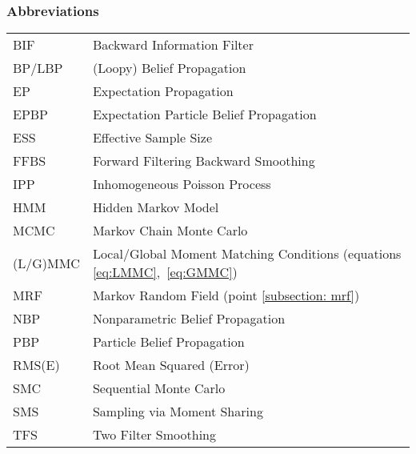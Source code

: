 %
\setlength{\tabcolsep}{6pt} %

\subsubsection*{Abbreviations}
\setlength{\tabcolsep}{12pt}
\renewcommand{\arraystretch}{1.2}
\begin{tabular}{ll}
BIF 	& Backward Information Filter\\
BP/LBP 	& (Loopy) Belief Propagation\\
EP	 	& Expectation Propagation\\
EPBP 	& Expectation Particle Belief Propagation\\
ESS 	& Effective Sample Size\\
FFBS 	& Forward Filtering Backward Smoothing \\
IPP 	& Inhomogeneous Poisson Process\\
HMM 	& Hidden Markov Model\\
MCMC 	& Markov Chain Monte Carlo\\
(L/G)MMC& Local/Global Moment Matching Conditions (equations \ref{eq:LMMC},~\ref{eq:GMMC})\\
MRF 	& Markov Random Field (point \ref{subsection: mrf})\\
NBP 	& Nonparametric Belief Propagation\\
PBP 	& Particle Belief Propagation\\
RMS(E) 	& Root Mean Squared (Error)\\
SMC 	& Sequential Monte Carlo\\
SMS 	& Sampling via Moment Sharing\\
TFS 	& Two Filter Smoothing\\ 

\end{tabular}
\setlength{\tabcolsep}{6pt} %
\newpage
